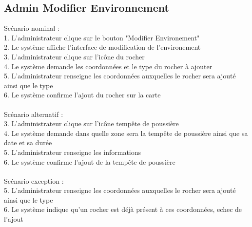 \documentclass[12pt,a4paper]{scrartcl}
\begin{document}
\subsection{Admin Modifier Environnement}
Scénario nominal :\\
1. L'administrateur clique sur le bouton "Modifier Environement"\\
2. Le système affiche l'interface de modification de l'environement\\
3. L'administrateur clique sur l'icône du rocher\\
4. Le système demande les coordonnées et le type du rocher à ajouter\\
5. L'administrateur renseigne les coordonnées auxquelles le rocher sera ajouté ainsi que le type\\
6. Le système confirme l'ajout du rocher sur la carte\\\\

Scénario alternatif : \\
3. L'administrateur clique sur l'icône tempête de poussière\\
4. Le système demande dans quelle zone sera la tempête de poussière ainsi que sa date et sa durée\\
5. L'administrateur renseigne les informations\\
6. Le système confirme l'ajout de la tempête de poussière\\\\

Scénario exception :\\
5. L'administrateur renseigne les coordonnées auxquelles le rocher sera ajouté ainsi que le type\\
6. Le système indique qu'un rocher est déjà présent à ces coordonnées, echec de l'ajout\\
\end{document}
